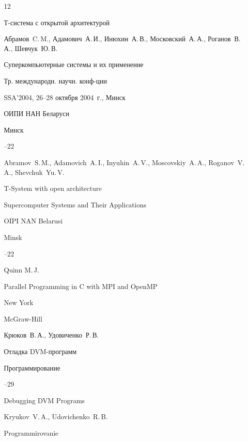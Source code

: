 \begin{thebibliography}{12}

\paper Т-система с открытой архитектурой 

\by Абрамов~C.\,M., Адамович~А.\,И., Инюхин~А.\,В., Московский~А.\,А., Роганов~В.\,А.,  Шевчук~Ю.\,В. 

\inbook Суперкомпьютерные системы и их применение 

\bookinfo  Тр. международн. научн. конф-ции

\procinfo SSA'2004, 26--28 октября 2004~г., Минск

\publ ОИПИ НАН Беларуси

\publaddr Минск


--22

\misctransl 

\by Abramov~S.\,M., Adamovich~A.\,I., Inyuhin~A.\,V., Moscovskiy~A.\,A., Roganov~V.\,A., Shevchuk~Yu.\,V.

\paper T-System with open architecture

\inbook Supercomputer Systems and Their Applications

\publ OIPI NAN Belarusi

\publaddr Minsk


--22






\by Quinn M.\,J.

\book Parallel Programming in C with MPI and OpenMP 

\publaddr New York

\publ McGraw-Hill






\by Крюков~В.\,А., Удовиченко~Р.\,В. 

\paper Отладка DVM-программ 

\jour Программирование



--29

\misctransl

\paper Debugging DVM Programs

\by Kryukov~V.\,A., Udovichenko~R.\,B.

\jour Programmi\-rovanie


\end{thebibliography}
